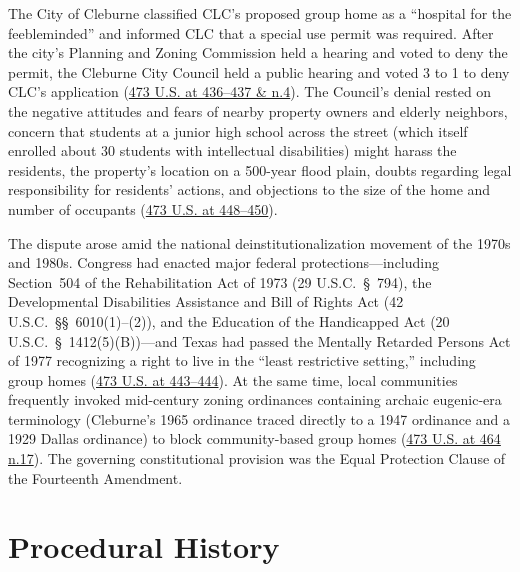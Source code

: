 \documentclass[12pt]{article}
\begin{document}
The City of Cleburne classified CLC's proposed group home as a ``hospital for the feebleminded'' and informed CLC that a special use permit was required. After the city's Planning and Zoning Commission held a hearing and voted to deny the permit, the Cleburne City Council held a public hearing and voted 3 to 1 to deny CLC's application (\href{https://supreme.justia.com/cases/federal/us/473/432/}{473 U.S. at 436--437 \& n.4}). The Council's denial rested on the negative attitudes and fears of nearby property owners and elderly neighbors, concern that students at a junior high school across the street (which itself enrolled about 30 students with intellectual disabilities) might harass the residents, the property's location on a 500-year flood plain, doubts regarding legal responsibility for residents' actions, and objections to the size of the home and number of occupants (\href{https://supreme.justia.com/cases/federal/us/473/432/}{473 U.S. at 448--450}).

The dispute arose amid the national deinstitutionalization movement of the 1970s and 1980s. Congress had enacted major federal protections---including Section~504 of the Rehabilitation Act of 1973 (29 U.S.C.\ \S~794), the Developmental Disabilities Assistance and Bill of Rights Act (42 U.S.C.\ \S\S~6010(1)--(2)), and the Education of the Handicapped Act (20 U.S.C.\ \S~1412(5)(B))---and Texas had passed the Mentally Retarded Persons Act of 1977 recognizing a right to live in the ``least restrictive setting,'' including group homes (\href{https://supreme.justia.com/cases/federal/us/473/432/}{473 U.S. at 443--444}). At the same time, local communities frequently invoked mid-century zoning ordinances containing archaic eugenic-era terminology (Cleburne's 1965 ordinance traced directly to a 1947 ordinance and a 1929 Dallas ordinance) to block community-based group homes (\href{https://supreme.justia.com/cases/federal/us/473/432/}{473 U.S. at 464 n.17}). The governing constitutional provision was the Equal Protection Clause of the Fourteenth Amendment.

\section{Procedural History}
\end{document}
